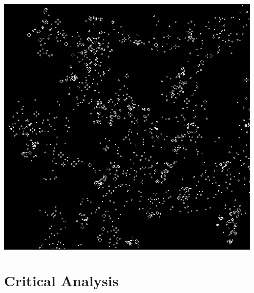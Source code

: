 \documentclass[11pt, oneside]{article}
\newenvironment{Figure}
  {\par\medskip\noindent\minipage{\linewidth}}
  {\endminipage\par\medskip}
\begin{document}
\begin{multicols}{3}
\begin{Figure}
\includegraphics[width=\linewidth]{images/512x512_2.png}
\end{Figure}

\end{multicols}

\pagebreak
\section{Critical Analysis}




\end{document}
